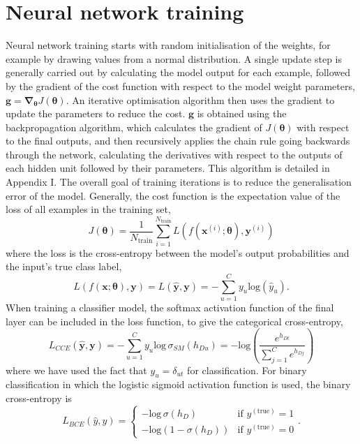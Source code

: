 \documentclass[12pt]{article}
\begin{document}
\section{Neural network training}
Neural network training starts with random initialisation of the weights, for example by drawing values from a normal distribution. A single update step is generally carried out by calculating the model output for each example, followed by the gradient of the cost function with respect to the model weight parameters, $\bm{g}=\bm\nabla_{\bm\theta}J(\bm\theta)$. An iterative optimisation algorithm then uses the gradient to update the parameters to reduce the cost. $\bm{g}$ is obtained using the backpropagation algorithm, which calculates the gradient of $J(\bm\theta)$ with respect to the final outputs, and then recursively applies the chain rule going backwards through the network, calculating the derivatives with respect to the outputs of each hidden unit followed by their parameters. This algorithm is detailed in Appendix I. The overall goal of training iterations is to reduce the generalisation error of the model. Generally, the cost function is the expectation value of the loss of all examples in the training set,
\begin{equation}
J(\boldsymbol\theta)=\frac{1}{N_{\mathrm{train}}}\sum_{i=1}^{N_{\mathrm{train}}}L(f(\bm{x}^{(i)};\boldsymbol\theta),\bm{y}^{(i)})
\end{equation}
where the loss is the cross-entropy between the model's output probabilities and the input's true class label,
\begin{equation}
L(f(\bm{x};\boldsymbol\theta),\bm{y})=L(\hat{\bm{y}},\bm{y})=-\sum_{u=1}^Cy_u\mathrm{log}(\hat{y}_u).
\end{equation}
When training a classifier model, the softmax activation function of the final layer can be included in the loss function, to give the categorical cross-entropy,
\begin{equation}
L_{CCE}(\hat{\bm{y}},\bm{y})=-\sum_{u=1}^Cy_u\mathrm{log}\,\sigma_{SM}(h_{Du})=-\mathrm{log}\left(\frac{e^{h_{Dt}}}{\sum_{j=1}^{C}e^{h_{Dj}}}\right)
\end{equation}
where we have used the fact that $y_u=\delta_{ut}$ for classification. For binary classification in which the logistic sigmoid activation function is used, the binary cross-entropy is
\begin{equation}
L_{BCE}(\hat{y},y)=
\left\{
\begin{array}{ll}
-\mathrm{log}\,\sigma(h_D)  & \mbox{if } y^{(\mathrm{true})}=1 \\
-\mathrm{log}\left(1-\sigma(h_D)\right) & \mbox{if } y^{(\mathrm{true})}=0
\end{array}
\right..
\end{equation}
\end{document}
